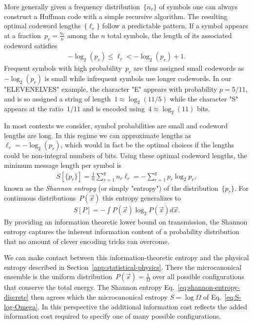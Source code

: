 More generally given a frequency distribution~$\{n_r\}$ of symbols one can always construct a Huffman code with a simple recursive algorithm. The resulting optimal codeword lengths~$\{\ell_r\}$ follow a predictable pattern. If a symbol appears at a fraction~$p_r = \frac{n_r}{n}$ among the $n$ total symbols, the length of its associated codeword satisfies \begin{align}
      -\log_2(p_r) \leq \ell_r < -\log_2(p_r) + 1.
\end{align} 
Frequent symbols with high probability~$p_r$ are thus assigned small codewords as~$-\log_2(p_r)$ is small while infrequent symbols use longer codewords. In our "ELEVENELVES" example, the character "E" appears with probability $p = 5/11$, and is so assigned a string of length~$1 \approx \log_2(11/5)$ while the character "S" appears at the ratio~$1/11$ and is encoded using~$4 \approx \log_2(11)$ bits. 

In most contexts we consider, symbol probabilities are small and codeword lengths are long. In this regime we can approximate lengths as~$\ell_r = -\log_2(p_r)$, which would in fact be the optimal choices if the lengths could be non-integral numbers of bits. Using these optimal codeword lengths, the minimum message length per symbol is \begin{align}
    S[\{p_r\}] = \frac{1}{n} \sum_{r=1}^q n_r \ell_r = -\sum_{r=1}^q p_r \log_2 p_r, \label{eq:shannon-entropy-discrete}
\end{align}
known as the \emph{Shannon entropy} (or simply "entropy") of the distribution~$\{p_r\}$. For continuous distributions~$P(\vec{x})$ this entropy generalizes to \begin{align}
S[P] = -\int P(\vec{x}) \log_2 P(\vec{x}) d\vec{x}. \label{eq:shannon-entropy-continuous}
\end{align} 
By providing an information theoretic lower bound on transmission, the Shannon entropy captures the inherent information content of a probability distribution that no amount of clever encoding tricks can overcome. 

We can make contact between this information-theoretic entropy and the physical entropy described in Section~\ref{app:statistical-physics}. There the microcanonical ensemble is the uniform distribution~$P(\vec{s}) = \frac{1}{\Omega}$ over all possible configurations that conserve the total energy. The Shannon entropy Eq.~\eqref{eq:shannon-entropy-discrete} then agrees which the microcanonical entropy $S = \log \Omega$ of Eq.~\eqref{eq:S-log-Omega}. In this perspective the additional information cost reflects the added information cost required to specify one of many possible configurations. 

